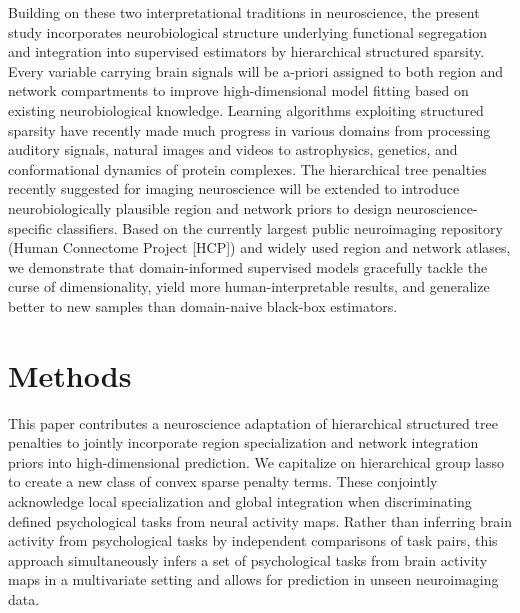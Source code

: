 \documentclass[runningheads,a4paper]{llncs}
\begin{document}
Building on these two
interpretational traditions in neuroscience,
the present study incorporates
neurobiological structure underlying
functional segregation and integration
into supervised estimators
by hierarchical structured sparsity.
Every variable carrying brain signals
will be a-priori assigned to both region and network compartments to
improve high-dimensional model fitting based on
existing neurobiological knowledge.
%
Learning algorithms
exploiting structured sparsity 
have recently made much progress in various domains
from processing auditory signals,
natural images %
and
videos
to
astrophysics, %
genetics, %
and
conformational dynamics of protein complexes. %
%
The hierarchical tree penalties recently suggested for imaging neuroscience
\cite{jenatton2012multi} will be extended to
introduce neurobiologically plausible region and network priors
to design neuroscience-specific classifiers.
%
Based on the currently largest public neuroimaging repository
(Human Connectome Project [HCP])
and widely used region \cite{crad12} and network \cite{smith2009} atlases,
we demonstrate that domain-informed supervised models
gracefully tackle the curse of dimensionality,
yield more human-interpretable results,
and generalize better to new samples
than domain-naive black-box estimators.
\nopagebreak
\section{Methods}
This paper contributes a neuroscience adaptation of hierarchical structured
tree penalties to jointly incorporate region 
specialization and network integration priors into high-dimensional 
prediction.
We capitalize on hierarchical group lasso
to create a new class of convex sparse penalty terms.
These conjointly acknowledge local specialization and 
global integration when discriminating defined psychological tasks
from neural activity maps.
Rather than inferring brain activity from psychological tasks
by independent comparisons of task pairs,
this approach simultaneously infers
a set of psychological tasks from brain activity maps
in a multivariate setting and allows for
prediction in unseen neuroimaging data.
%
\end{document}

